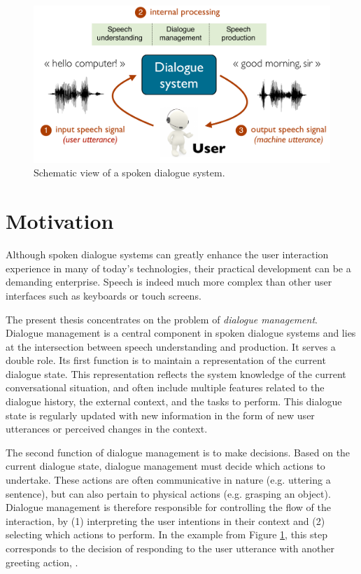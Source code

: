 \begin{figure}[h]
\center
\includegraphics[scale=0.46]{imgs/basicsds.pdf}
\caption{Schematic view of a spoken dialogue system.}
\label{fig:basicsds}
\end{figure}

\section{Motivation}

Although spoken dialogue systems can greatly enhance the user interaction experience in many of today's technologies, their practical development can be a demanding enterprise. Speech is indeed much more complex than other user interfaces such as keyboards or touch screens.  

The present thesis concentrates on the problem of \textit{dialogue management}.  Dialogue management is a central component in spoken dialogue systems and lies at the intersection between speech understanding and production.  It serves a double role. Its first function is to maintain a representation of the current dialogue state. This representation reflects the system knowledge of the current conversational situation, and often include multiple features related to the dialogue history, the external context, and the tasks to perform.  This dialogue state is regularly updated with new information in the form of new user utterances or perceived changes in the context. 

The second function of dialogue management is to make decisions.  Based on the current dialogue state, dialogue management must decide which actions to undertake. These actions are often communicative in nature (e.g. uttering a sentence), but can also pertain to physical actions (e.g. grasping an object).  Dialogue management is therefore responsible for controlling the flow of the interaction, by (1) interpreting the user intentions in their context and (2) selecting which actions to perform. In the example from Figure \ref{fig:basicsds}, this step corresponds to the decision of responding to the user utterance  with another greeting action, . 

